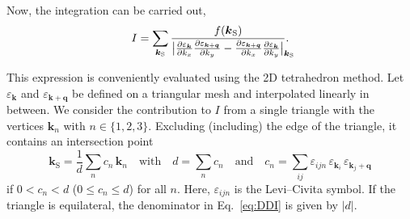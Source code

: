 \documentclass[a4paper]{article}
\def\sub#1{_{\text{#1}}}
\def\from#1{_{\mathrlap{#1}}}
\let\epsilon\varepsilon
\let\vec\boldsymbol
\begin{document}
%
Now, the integration can be carried out,
%
\begin{equation}
    \label{eq:DDI}
    I = \sum_{\vec k \sub S}
    \frac{f(\vec k \sub S)}
    {\big|
        \frac{\partial \epsilon_{\vec k}}{\partial k_x}
        \frac{\partial \epsilon_{\vec k + \vec q}}{\partial k_y}
        -
        \frac{\partial \epsilon_{\vec k + \vec q}}{\partial k_x}
        \frac{\partial \epsilon_{\vec k}}{\partial k_y}
    \big| \from{\vec k \sub S}}.
\end{equation}

This expression is conveniently evaluated using the 2D tetrahedron method. Let $\epsilon_{\vec k}$ and $\epsilon_{\vec k + \vec q}$ be defined on a triangular mesh and interpolated linearly in between. We consider the contribution to $I$ from a single triangle with the vertices $\vec k_n$ with $n \in \{ 1, 2, 3 \}$. Excluding (including) the edge of the triangle, it contains an intersection point
%
\begin{equation}
    \vec k \sub S = \frac 1 d \sum_n c_n \, \vec k_n
    \quad \text{with} \quad
    d = \sum_n c_n
    \quad \text{and} \quad
    c_n = \sum_{i j} \epsilon_{i j n} \, \epsilon_{\vec k_i} \, \epsilon_{\vec k_j + \vec q}
\end{equation}
%
    if $0 < c_n < d$ ($0 \leq c_n \leq d$) for all $n$. Here, $\epsilon_{i j n}$ is the Levi--Civita symbol. If the triangle is equilateral, the denominator in Eq.~\ref{eq:DDI} is given by $|d|$.
\end{document}
